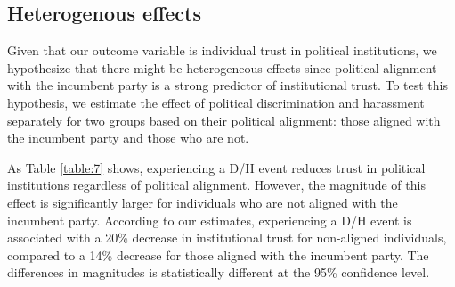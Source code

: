 \documentclass{article}
\begin{document}


% 

\subsection{Heterogenous effects}

Given that our outcome variable is individual trust in political institutions, we hypothesize that there might be heterogeneous effects since political alignment with the incumbent party is a strong predictor of institutional trust. To test this hypothesis, we estimate the effect of political discrimination and harassment separately for two groups based on their political alignment: those aligned with the incumbent party and those who are not.

As Table \ref{table:7} shows, experiencing a D/H event reduces trust in political institutions regardless of political alignment. However, the magnitude of this effect is significantly larger for individuals who are not aligned with the incumbent party. According to our estimates, experiencing a D/H event is associated with a 20\% decrease in institutional trust for non-aligned individuals, compared to a 14\% decrease for those aligned with the incumbent party. The differences in magnitudes is statistically different at the 95\% confidence level.

 
 
\end{document}
